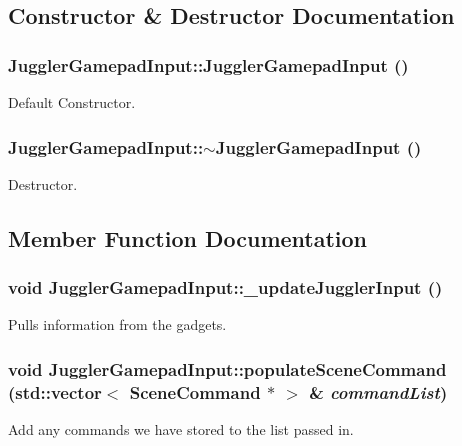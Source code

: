 \subsection{Constructor \& Destructor Documentation}
\hypertarget{class_juggler_gamepad_input_a399123ac6edc2d1375648648354049ca}{
\subsubsection[{JugglerGamepadInput}]{\setlength{\rightskip}{0pt plus 5cm}JugglerGamepadInput::JugglerGamepadInput ()}}
\label{class_juggler_gamepad_input_a399123ac6edc2d1375648648354049ca}
Default Constructor. \hypertarget{class_juggler_gamepad_input_afdbfb9c5eba3c3074771b74937bbe704}{
\subsubsection[{$\sim$JugglerGamepadInput}]{\setlength{\rightskip}{0pt plus 5cm}JugglerGamepadInput::$\sim$JugglerGamepadInput ()}}
\label{class_juggler_gamepad_input_afdbfb9c5eba3c3074771b74937bbe704}
Destructor. 

\subsection{Member Function Documentation}
\hypertarget{class_juggler_gamepad_input_ab91402ac9790ea085264b759ad9f759e}{
\subsubsection[{\_\-updateJugglerInput}]{\setlength{\rightskip}{0pt plus 5cm}void JugglerGamepadInput::\_\-updateJugglerInput ()}}
\label{class_juggler_gamepad_input_ab91402ac9790ea085264b759ad9f759e}
Pulls information from the gadgets. \hypertarget{class_juggler_gamepad_input_aa2ead837a9d4ba9d94701e675b6d61d4}{
\subsubsection[{populateSceneCommand}]{\setlength{\rightskip}{0pt plus 5cm}void JugglerGamepadInput::populateSceneCommand (std::vector$<$ {\bf SceneCommand} $\ast$ $>$ \& {\em commandList})}}
\label{class_juggler_gamepad_input_aa2ead837a9d4ba9d94701e675b6d61d4}
Add any commands we have stored to the list passed in. 

